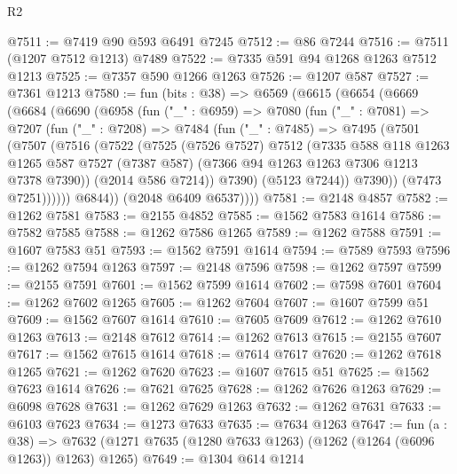\begin{lexlean}{R2}
\begin{coremodule}
@7511 := @7419 @90 @593 @6491 @7245
@7512 := @86 @7244
@7516 := @7511 (@1207 @7512 @1213) @7489
@7522 := @7335 @591 @94 @1268 @1263 @7512 @1213
@7525 := @7357 @590 @1266 @1263
@7526 := @1207 @587
@7527 := @7361 @1213
@7580 := fun (bits : @38) =>
  @6569
    (@6615
      (@6654
        (@6669
          (@6684
            (@6690
              (@6958
                (fun ("_" : @6959) =>
                @7080
                  (fun ("_" : @7081) =>
                  @7207
                    (fun ("_" : @7208) =>
                    @7484
                      (fun ("_" : @7485) =>
                      @7495
                        (@7501
                          (@7507
                            (@7516
                              (@7522
                                (@7525
                                  (@7526 @7527)
                                  @7512
                                  (@7335
                                    @588
                                    @118
                                    @1263
                                    @1265
                                    @587
                                    @7527
                                    (@7387 @587)
                                    (@7366 @94 @1263 @1263 @7306 @1213 @7378 @7390))
                                  (@2014 @586 @7214))
                                @7390)
                              (@5123 @7244))
                            @7390))
                        (@7473 @7251))))))
              @6844))
          (@2048 @6409 @6537))))
@7581 := @2148 @4857
@7582 := @1262 @7581
@7583 := @2155 @4852
@7585 := @1562 @7583 @1614
@7586 := @7582 @7585
@7588 := @1262 @7586 @1265
@7589 := @1262 @7588
@7591 := @1607 @7583 @51
@7593 := @1562 @7591 @1614
@7594 := @7589 @7593
@7596 := @1262 @7594 @1263
@7597 := @2148 @7596
@7598 := @1262 @7597
@7599 := @2155 @7591
@7601 := @1562 @7599 @1614
@7602 := @7598 @7601
@7604 := @1262 @7602 @1265
@7605 := @1262 @7604
@7607 := @1607 @7599 @51
@7609 := @1562 @7607 @1614
@7610 := @7605 @7609
@7612 := @1262 @7610 @1263
@7613 := @2148 @7612
@7614 := @1262 @7613
@7615 := @2155 @7607
@7617 := @1562 @7615 @1614
@7618 := @7614 @7617
@7620 := @1262 @7618 @1265
@7621 := @1262 @7620
@7623 := @1607 @7615 @51
@7625 := @1562 @7623 @1614
@7626 := @7621 @7625
@7628 := @1262 @7626 @1263
@7629 := @6098 @7628
@7631 := @1262 @7629 @1263
@7632 := @1262 @7631
@7633 := @6103 @7623
@7634 := @1273 @7633
@7635 := @7634 @1263
@7647 := fun (a : @38) =>
  @7632 (@1271 @7635 (@1280 @7633 @1263) (@1262 (@1264 (@6096 @1263)) @1263) @1265)
@7649 := @1304 @614 @1214

\end{coremodule}
\end{lexlean}
